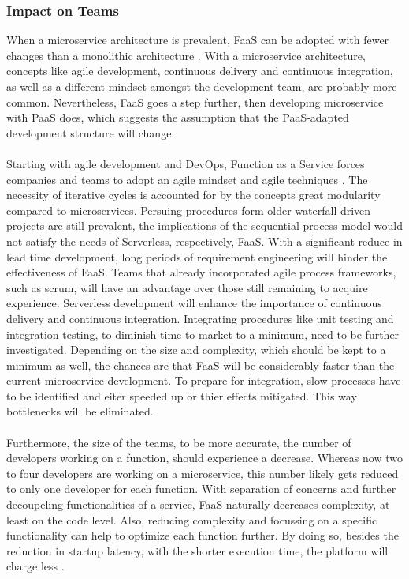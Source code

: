 \documentclass[a4paper,twoside,11pt, pagesize]{scrartcl}
\begin{document}
\subsubsection{Impact on Teams}
When a microservice architecture is prevalent, FaaS can be adopted with fewer changes than a monolithic architecture \cite{fox2017status}. With a microservice architecture, concepts like agile development, continuous delivery and continuous integration, as well as a different mindset amongst the development team, are probably more common. Nevertheless, FaaS goes a step further, then developing microservice with PaaS does, which suggests the assumption that the PaaS-adapted development structure will change.\\\\ Starting with agile development and \glqq DevOps\grqq{}, Function as a Service forces companies and teams to adopt an agile mindset and agile techniques \cite{benlian2018transformative}. The necessity of iterative cycles is accounted for by the concepts great modularity compared to microservices. Persuing procedures form older waterfall driven projects are still prevalent, the implications of the sequential process model would not satisfy the needs of Serverless, respectively, FaaS. With a significant reduce in lead time development, long periods of requirement engineering will hinder the effectiveness of FaaS. Teams that already incorporated agile process frameworks, such as scrum, will have an advantage over those still remaining to acquire experience. Serverless development will enhance the importance of continuous delivery and continuous integration. Integrating procedures like unit testing and integration testing, to diminish time to market to a minimum, need to be further investigated. Depending on the size and complexity, which should be kept to a minimum as well, the chances are that FaaS will be considerably faster than the current microservice development. To prepare for integration, slow processes have to be identified and eiter speeded up or thier effects mitigated. This way bottlenecks will be eliminated.\\\\ Furthermore, the size of the teams, to be more accurate, the number of developers working on a function, should experience a decrease. Whereas now two to four developers are working on a microservice, this number likely gets reduced to only one developer for each function. With separation of concerns and further decoupeling functionalities of a service, FaaS naturally decreases complexity, at least on the code level. Also, reducing complexity and focussing on a specific functionality can help to optimize each function further. By doing so, besides the reduction in startup latency, with the shorter execution time, the platform will charge less \cite{shafiei2020serverless}.\\\\ 
\end{document}
